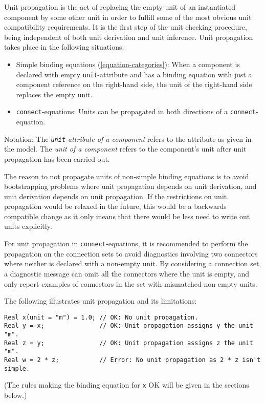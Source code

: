 Unit propagation is the act of replacing the empty unit of an instantiated component by some other unit in order to fulfill some of the most obvious unit compatibility requirements.
It is the first step of the unit checking procedure, being independent of both unit derivation and unit inference.
Unit propagation takes place in the following situations:
\begin{itemize}
\item
  Simple binding equations (\cref{equation-categories}):
  When a component is declared with empty \lstinline!unit!-attribute and has a binding equation with just a component reference on the right-hand side, the unit of the right-hand side replaces the empty unit.
\item
  \lstinline!connect!-equations:
  Units can be propagated in both directions of a \lstinline!connect!-equation.
\end{itemize}

Notation: The \emph{\lstinline!unit!-attribute of a component} refers to the attribute as given in the model.
The \emph{unit of a component} refers to the component's unit after unit propagation has been carried out.

\begin{nonnormative}
The reason to not propagate units of non-simple binding equations is to avoid bootstrapping problems where unit propagation depends on unit derivation, and unit derivation depends on unit propagation.
If the restrictions on unit propagation would be relaxed in the future, this would be a backwards compatible change as it only means that there would be less need to write out units explicitly.
\end{nonnormative}

\begin{nonnormative}
For unit propagation in \lstinline!connect!-equations, it is recommended to perform the propagation on the connection sets to avoid diagnostics involving two connectors where neither is declared with a non-empty unit.
By considering a connection set, a diagnostic message can omit all the connectors where the unit is empty, and only report examples of connectors in the set with mismatched non-empty units.
\end{nonnormative}

\begin{example}
The following illustrates unit propagation and its limitations:
\begin{lstlisting}[language=modelica]
Real x(unit = "m") = 1.0; // OK: No unit propagation.
Real y = x;               // OK: Unit propagation assigns y the unit "m".
Real z = y;               // OK: Unit propagation assigns z the unit "m".
Real w = 2 * z;           // Error: No unit propagation as 2 * z isn't simple.
\end{lstlisting}
(The rules making the binding equation for \lstinline!x! OK will be given in the sections below.)
\end{example}


